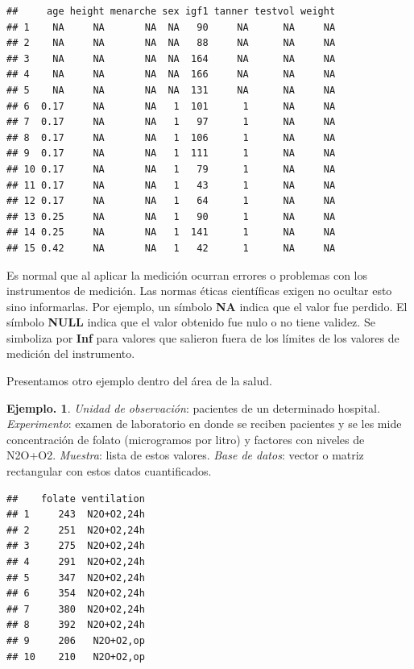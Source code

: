 \documentclass[]{book}
\theoremstyle{definition}
\theoremstyle{definition}
\newtheorem{example}{Ejemplo.}[chapter]
\theoremstyle{definition}
\theoremstyle{remark}
\begin{document}
\begin{verbatim}
##     age height menarche sex igf1 tanner testvol weight
## 1    NA     NA       NA  NA   90     NA      NA     NA
## 2    NA     NA       NA  NA   88     NA      NA     NA
## 3    NA     NA       NA  NA  164     NA      NA     NA
## 4    NA     NA       NA  NA  166     NA      NA     NA
## 5    NA     NA       NA  NA  131     NA      NA     NA
## 6  0.17     NA       NA   1  101      1      NA     NA
## 7  0.17     NA       NA   1   97      1      NA     NA
## 8  0.17     NA       NA   1  106      1      NA     NA
## 9  0.17     NA       NA   1  111      1      NA     NA
## 10 0.17     NA       NA   1   79      1      NA     NA
## 11 0.17     NA       NA   1   43      1      NA     NA
## 12 0.17     NA       NA   1   64      1      NA     NA
## 13 0.25     NA       NA   1   90      1      NA     NA
## 14 0.25     NA       NA   1  141      1      NA     NA
## 15 0.42     NA       NA   1   42      1      NA     NA
\end{verbatim}

Es normal que al aplicar la medición ocurran errores o
problemas con los instrumentos de medición.
Las normas éticas científicas exigen no ocultar esto sino
informarlas. Por ejemplo,
un símbolo \textbf{NA} indica que el valor fue perdido. El
símbolo \textbf{NULL} indica que el valor
obtenido fue nulo o no tiene validez. Se simboliza por
\textbf{Inf} para valores que salieron fuera de
los límites de los valores de medición del instrumento.

Presentamos otro ejemplo dentro del área de la salud.

\begin{example}
\protect\hypertarget{exm:unnamed-chunk-18}{}{\label{exm:unnamed-chunk-18} }\emph{Unidad de observación}: pacientes de un determinado
hospital. \emph{Experimento}: examen de
laboratorio en donde se reciben pacientes y se les mide
concentración de folato (microgramos por
litro) y factores con niveles de N2O+O2. \emph{Muestra}:
lista de estos valores. \emph{Base de datos}:
vector o matriz rectangular con estos datos
cuantificados.\\
\end{example}

\begin{verbatim}
##    folate ventilation
## 1     243  N2O+O2,24h
## 2     251  N2O+O2,24h
## 3     275  N2O+O2,24h
## 4     291  N2O+O2,24h
## 5     347  N2O+O2,24h
## 6     354  N2O+O2,24h
## 7     380  N2O+O2,24h
## 8     392  N2O+O2,24h
## 9     206   N2O+O2,op
## 10    210   N2O+O2,op
\end{verbatim}
\end{document}
